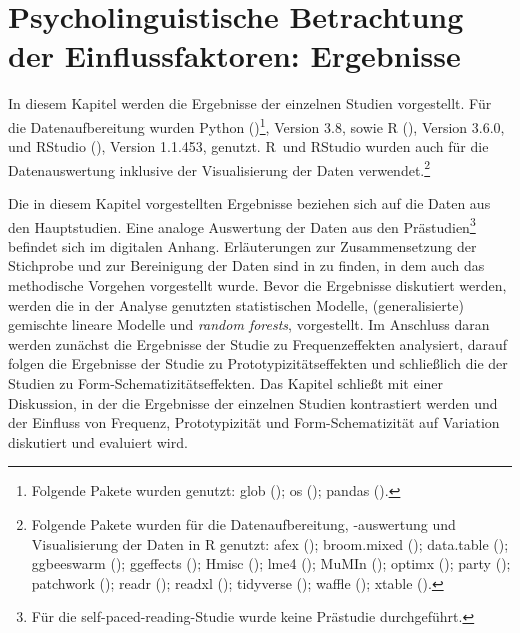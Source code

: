 \chapter{Psycholinguistische Betrachtung der Einflussfaktoren: Ergebnisse}\label{Ergebnisse}

In diesem Kapitel werden die Ergebnisse der einzelnen Studien vorgestellt. Für die Datenaufbereitung wurden Python (\cite{vanRossum.2009})\footnote{Folgende Pakete wurden genutzt: glob (\cite{vanRossum.2009}); os (\cite{vanRossum.2009}); pandas (\cite{McKinney.2010}).}, Version 3.8,  sowie R (\cite{RCoreTeam.2019}), Version 3.6.0, und RStudio (\cite{RStudioTeam.2016}), Version 1.1.453, genutzt. R~und RStudio wurden auch für die Datenauswertung inklusive der Visualisierung der Daten verwendet.\footnote{Folgende Pakete wurden für die Datenaufbereitung, -auswertung und Visualisierung der Daten in R genutzt: afex (\cite{Singmann.2019}); broom.mixed (\cite{Bolker.2019}); data.table (\cite{Dowle.2019}); ggbee\-swarm (\cite{Clarke.2017}); ggeffects (\cite{Ludecke.2018}); Hmisc (\cite{Harrell.2019}); lme4 (\cite{Bates.2015}); MuMIn (\cite{Barton.2019}); optimx (\cite{Nash.2011}); party (\cite{Hothorn.2006, Strobl.2008}); patchwork (\cite{Pedersen.2020}); readr (\cite{Wickham.2018}); readxl (\cite{Wickham.2019}); tidyverse (\cite{Wickham.2017}); waffle (\cite{Rudis.2019}); xtable (\cite{Dahl.2019}).}  



Die in diesem Kapitel vorgestellten Ergebnisse beziehen sich auf die Daten aus den Hauptstudien. Eine analoge Auswertung der Daten aus den Prästudien\footnote{Für die self-paced-reading-Studie wurde keine Prästudie durchgeführt.} befindet sich im digitalen Anhang. Erläuterungen zur Zusammensetzung der Stichprobe und zur Bereinigung der Daten sind in  zu finden, in dem auch das methodische Vorgehen vorgestellt wurde. Bevor die Ergebnisse diskutiert werden, werden die in der Analyse genutzten statistischen Modelle, (generalisierte) gemischte lineare Modelle und \textit{random forests}, vorgestellt. Im Anschluss daran werden zunächst die Ergebnisse der Studie zu Frequenzeffekten analysiert, darauf folgen die Ergebnisse der Studie zu Prototypizitätseffekten und schließlich die der Studien zu Form-Schematizitätseffekten. Das Kapitel schließt mit einer Diskussion, in der die Ergebnisse der einzelnen Studien kontrastiert werden und der Einfluss von Frequenz, Prototypizität und Form-Schematizität auf Variation diskutiert und evaluiert wird. 



